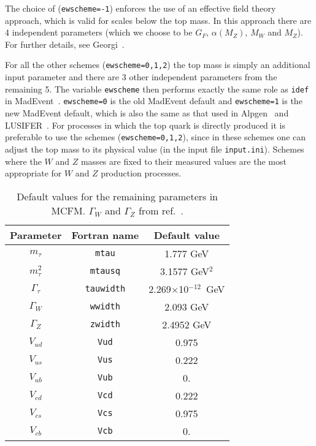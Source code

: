 The choice of ({\tt ewscheme=-1}) enforces the use of an effective field
theory approach, which is valid for scales below the top mass. In this
approach there are 4 independent parameters (which we choose to be
$G_F$, $\alpha(M_Z)$, $M_W$ and $M_Z$). For further details,
see Georgi~\cite{Georgi:1991ci}.

For all the other schemes ({\tt ewscheme=0,1,2}) the top mass is simply
an additional input parameter and there are 3 other independent
parameters from the remaining 5. The variable {\tt ewscheme} then performs
exactly the same role as {\tt idef} in MadEvent~\cite{Maltoni:2002qb}.
{\tt ewscheme=0} is the old MadEvent default and {\tt ewscheme=1} is the
new MadEvent default, which is also the same as that used in 
Alpgen~\cite{Alpgen} and LUSIFER~\cite{Lusifer}. 
For processes in which the top quark is directly produced  it is 
preferable to use  the schemes ({\tt ewscheme=0,1,2}), since in these schemes
one can adjust the top mass to its physical value (in the input file
{\tt input.ini}). Schemes where the $W$ and $Z$ masses are fixed to their measured
values are the most appropriate for $W$ and $Z$ production processes.

\begin{table}
\begin{center}
	\caption{Default values for the remaining parameters in MCFM.
		$\Gamma_W$ and $\Gamma_Z$ from ref.~\cite{Amsler:2008zzb}.}
	\label{default} 
	\vspace{0.5em}
\begin{tabular}{|c|c|c|} \hline
Parameter & Fortran name & Default value \\ 
\hline
$m_\tau$         & {\tt mtau}      & 1.777 GeV            \\
$m^2_\tau$& {\tt mtausq}  & 3.1577 GeV$^2$     \\
$\Gamma_\tau$    & {\tt tauwidth}& 2.269$\times$10$^{-12}$~GeV \\
$\Gamma_W$       & {\tt wwidth}  & 2.093 GeV               \\
$\Gamma_Z$       & {\tt zwidth}  & 2.4952 GeV               \\
$V_{ud}$         & {\tt Vud}     & 0.975                  \\
$V_{us}$         & {\tt Vus}     & 0.222             \\
$V_{ub}$         & {\tt Vub}     & 0.                     \\
$V_{cd}$         & {\tt Vcd}     & 0.222             \\
$V_{cs}$         & {\tt Vcs}     & 0.975                  \\
$V_{cb}$         & {\tt Vcb}     & 0.                     \\
\hline
\end{tabular}

\end{center}
\end{table}

